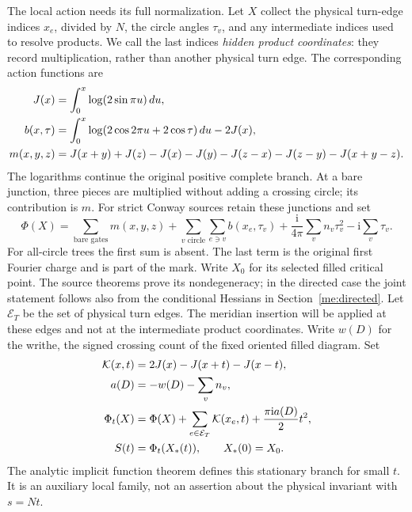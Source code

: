 \documentclass[11pt]{article}
\numberwithin{equation}{section}
\theoremstyle{definition}\newtheorem{definition}[theorem]{Definition}
\newcommand{\ii}{\mathrm i}
\newcommand{\Kern}{\mathcal K}
\begin{document}
The local action needs its full normalization. Let $X$ collect the physical turn-edge indices $x_e$, divided by
$N$, the circle angles $\tau_v$, and any intermediate indices used
to resolve products. We call the last indices \emph{hidden product
coordinates}: they record multiplication, rather than another
physical turn edge. The corresponding action functions are
\begin{align}
 J(x)&=\int_0^x\log(2\sin\pi u)\,du,\notag\\
 b(x,\tau)&=\int_0^x\log(2\cos2\pi u+2\cos\tau)\,du-2J(x),\notag\\
 m(x,y,z)&=J(x+y)+J(z)-J(x)-J(y)
                 -J(z-x)-J(z-y)-J(x+y-z).\label{me:local-actions}
\end{align}
The logarithms continue the original positive complete branch.
At a bare junction, three pieces are multiplied without adding a
crossing circle; its contribution is $m$. For strict Conway sources
retain these junctions and set
\begin{equation}\label{me:base-action}
 \Phi(X)=\sum_{\text{bare gates}}m(x,y,z)
  +\sum_{v\text{ circle}}\sum_{e\ni v}b(x_e,\tau_v)
  +\frac{\ii}{4\pi}\sum_vn_v\tau_v^2-\ii\sum_v\tau_v.
\end{equation}
For all-circle trees the first sum is absent. The last term is the
original first Fourier charge and is part of the mark. Write $X_0$
for its selected filled critical point. The source theorems prove
its nondegeneracy; in the directed case the joint statement follows
also from the conditional Hessians in Section~\ref{me:directed}.
Let $\mathcal E_T$ be the set of physical turn edges. The meridian
insertion will be applied at these edges and not at the intermediate
product coordinates. Write $w(D)$ for the writhe, the signed crossing
count of the fixed oriented filled diagram. Set
\begin{align}
 \Kern(x,t)&=2J(x)-J(x+t)-J(x-t),\notag\\
 a(D)&=-w(D)-\sum_v n_v,\notag\\
 \Phi_t(X)&=\Phi(X)+\sum_{e\in\mathcal E_T}\Kern(x_e,t)
                          +\frac{\pi\ii a(D)}2t^2,\label{me:deformed-action}\\
 S(t)&=\Phi_t(X_*(t)),\qquad X_*(0)=X_0.\notag
\end{align}
The analytic implicit function theorem defines this stationary
branch for small $t$. It is an auxiliary local family, not an
assertion about the physical invariant with $s=Nt$.
\end{document}
